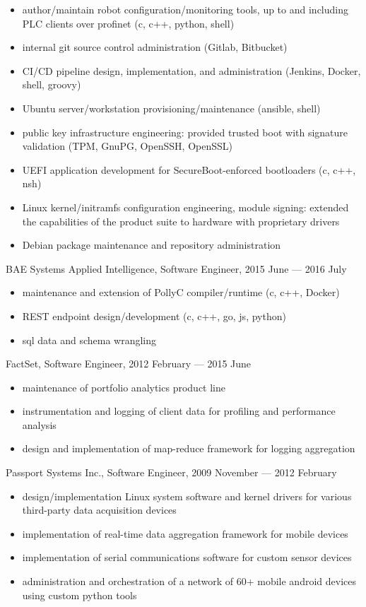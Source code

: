 \documentclass[letterpaper,12pt]{article}
\begin{document}
\begin{itemize}
\item author/maintain robot configuration/monitoring tools, up to and including
  PLC clients over profinet (c, c++, python, shell)
\item internal git source control administration (Gitlab, Bitbucket)
\item CI/CD pipeline design, implementation, and administration (Jenkins,
  Docker, shell, groovy)
\item Ubuntu server/workstation provisioning/maintenance (ansible, shell)
\item public key infrastructure engineering: provided trusted boot with
  signature validation (TPM, GnuPG, OpenSSH, OpenSSL)
\item UEFI application development for SecureBoot-enforced bootloaders (c, c++,
  nsh)
\item Linux kernel/initramfs configuration engineering, module signing:
  extended the capabilities of the product suite to hardware with proprietary
  drivers
\item Debian package maintenance and repository administration
\end{itemize}

BAE Systems Applied Intelligence, Software Engineer, 2015 June --- 2016 July

\begin{itemize}
\item maintenance and extension of PollyC compiler/runtime (c, c++, Docker)
\item REST endpoint design/development (c, c++, go, js, python)
\item sql data and schema wrangling
\end{itemize}

FactSet, Software Engineer, 2012 February --- 2015 June

\begin{itemize}
\item maintenance of portfolio analytics product line
\item instrumentation and logging of client data for profiling and performance analysis
\item design and implementation of map-reduce framework for logging aggregation
\end{itemize}

Passport Systems Inc., Software Engineer, 2009 November --- 2012 February

\begin{itemize}
\item design/implementation Linux system software and kernel drivers for various
third-party data acquisition devices
\item implementation of real-time data aggregation framework for mobile devices
\item implementation of serial communications software for custom sensor devices
\item administration and orchestration of a network of 60+ mobile android devices using custom python tools
\end{itemize}
\end{document}

